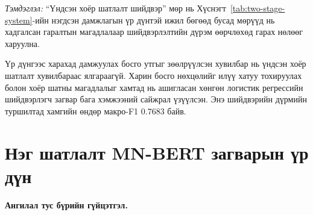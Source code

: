 \begin{table}[H]
\centering
\caption{Хоёр шатлалт шийдвэрлэлтийн дүрмийн хувилбаруудын үр дүн}
\label{tab:two-stage-rules}
\end{table}

\noindent\textit{Тэмдэглэл:} ``Үндсэн хоёр шатлалт шийдвэр'' мөр нь
Хүснэгт~\ref{tab:two-stage-system}-ийн нэгдсэн дамжлагын үр дүнтэй ижил бөгөөд
бусад мөрүүд нь хадгалсан гаралтын магадлалаар шийдвэрлэлтийн дүрэм өөрчлөхөд
гарах нөлөөг харуулна.\par

Үр дүнгээс харахад дамжуулах босго утгыг зөөлрүүлсэн хувилбар нь үндсэн хоёр шатлалт
хувилбараас ялгараагүй. Харин босго нөхцөлийг илүү хатуу тохируулах болон
хоёр шатны магадлалыг хамтад нь ашигласан хөнгөн логистик регрессийн шийдвэрлэгч загвар
бага хэмжээний сайжрал үзүүлсэн. Энэ шийдвэрийн дүрмийн туршилтад хамгийн өндөр
макро-F1 $0.7683$ байв.

\section{Нэг шатлалт MN-BERT загварын үр дүн}
\label{sec:one-stage-results}

\noindent\textbf{Ангилал тус бүрийн гүйцэтгэл.}\par

\begin{table}[H]
\centering
\caption{Нэг шатлалт MN-BERT загварын ангилал тус бүрийн гүйцэтгэл}
\label{tab:e2e}
\end{table}

